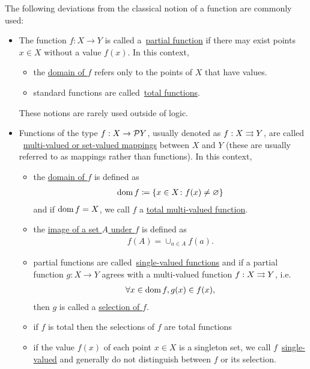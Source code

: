 \begin{definition}[Functions]
  The following deviations from the classical notion of a function are commonly used:
  \begin{itemize}
    \item The function $f: X \to Y$ is called a~\uline{partial function} if there may exist points $x \in X$ without a value $f(x)$. In this context,
    \begin{itemize}
      \item the \uline{domain of $f$} refers only to the points of $X$ that have values.
      \item standard functions are called~\uline{total functions}.
    \end{itemize}

    These notions are rarely used outside of logic.

    \item Functions of the type $f: X \to \mathcal{P} Y$, usually denoted as $f: X \rightrightarrows Y$, are called ~\uline{multi-valued or set-valued mappings} between $X$ and $Y$ (these are usually referred to as mappings rather than functions). In this context,
    \begin{itemize}
      \item the \uline{domain of $f$} is defined as
      \begin{align*}
        \operatorname{dom} f \coloneqq \{ x \in X \colon f(x) \neq \varnothing \}
      \end{align*}
      and if $\operatorname{dom} f = X$, we call $f$ a \uline{total multi-valued function}.

      \item the \uline{image of a set $A$ under $f$} is defined as
      \begin{align*}
        f(A) = \cup_{a \in A} f(a).
      \end{align*}

      \item partial functions are called~\uline{single-valued functions} and if a partial function $g: X \to Y$ agrees with a multi-valued function $f: X \rightrightarrows Y$, i.e.
      \begin{align*}
        \forall x \in \operatorname{dom} f, g(x) \in f(x),
      \end{align*}
      then $g$ is called a \uline{selection of $f$}.

      \item if $f$ is total then the selections of $f$ are total functions

      \item if the value $f(x)$ of each point $x \in X$ is a singleton set, we call $f$~\uline{single-valued} and generally do not distinguish between $f$ or its selection.
    \end{itemize}
  \end{itemize}
\end{definition}

